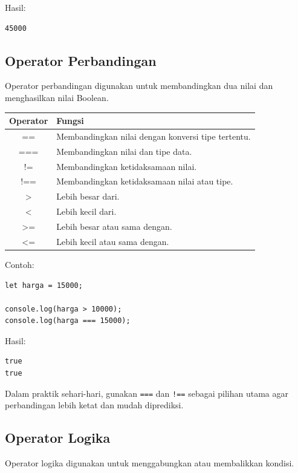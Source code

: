 \documentclass[12pt,a4paper]{article}
\begin{document}
Hasil:

\begin{lstlisting}
45000
\end{lstlisting}

\subsection{Operator Perbandingan}

Operator perbandingan digunakan untuk membandingkan
dua nilai dan menghasilkan nilai Boolean.

\begin{center}
\begin{tabularx}{\textwidth}{cX}
\toprule
\textbf{Operator} & \textbf{Fungsi} \\
\midrule
== & Membandingkan nilai dengan konversi tipe tertentu. \\
=== & Membandingkan nilai dan tipe data. \\
!= & Membandingkan ketidaksamaan nilai. \\
!== & Membandingkan ketidaksamaan nilai atau tipe. \\
> & Lebih besar dari. \\
< & Lebih kecil dari. \\
>= & Lebih besar atau sama dengan. \\
<= & Lebih kecil atau sama dengan. \\
\bottomrule
\end{tabularx}
\end{center}

Contoh:

\begin{lstlisting}
let harga = 15000;

console.log(harga > 10000);
console.log(harga === 15000);
\end{lstlisting}

Hasil:

\begin{lstlisting}
true
true
\end{lstlisting}

Dalam praktik sehari-hari, gunakan
\texttt{===} dan \texttt{!==} sebagai pilihan
utama agar perbandingan lebih ketat dan mudah
diprediksi.

\subsection{Operator Logika}

Operator logika digunakan untuk menggabungkan
atau membalikkan kondisi.
\end{document}
